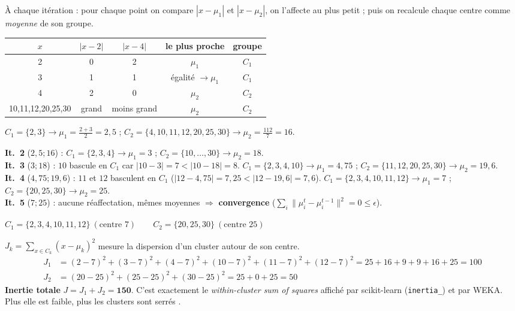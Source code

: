 À chaque itération : pour chaque point on compare $|x-\mu_1|$ et $|x-\mu_2|$, on l'affecte au
plus petit ; puis on recalcule chaque centre comme \emph{moyenne} de son groupe.

\begin{Calcul}[: itération 1 en entier ($\mu_1{=}2,\mu_2{=}4$)]
\begin{center}\small
\begin{tabular}{ccccc}
\toprule
$x$ & $|x-2|$ & $|x-4|$ & le plus proche & groupe\\
\midrule
2 & 0 & 2 & $\mu_1$ & $C_1$\\
3 & 1 & 1 & égalité $\to\mu_1$ & $C_1$\\
4 & 2 & 0 & $\mu_2$ & $C_2$\\
10,11,12,20,25,30 & grand & moins grand & $\mu_2$ & $C_2$\\
\bottomrule
\end{tabular}
\end{center}
$C_1=\{2,3\}\to\mu_1=\tfrac{2+3}{2}=2{,}5$ ;\quad
$C_2=\{4,10,11,12,20,25,30\}\to\mu_2=\tfrac{112}{7}=16$.
\end{Calcul}

\begin{Calcul}
\textbf{It.\ 2} ($2{,}5;16$) : $C_1=\{2,3,4\}\to\mu_1=3$ ; $C_2=\{10,\dots,30\}\to\mu_2=18$.\\
\textbf{It.\ 3} ($3;18$) : $10$ bascule en $C_1$ car $|10-3|=7<|10-18|=8$.
$C_1=\{2,3,4,10\}\to\mu_1=4{,}75$ ; $C_2=\{11,12,20,25,30\}\to\mu_2=19{,}6$.\\
\textbf{It.\ 4} ($4{,}75;19{,}6$) : $11$ et $12$ basculent en $C_1$ ($|12-4{,}75|=7{,}25<|12-19{,}6|=7{,}6$).
$C_1=\{2,3,4,10,11,12\}\to\mu_1=7$ ; $C_2=\{20,25,30\}\to\mu_2=25$.\\
\textbf{It.\ 5} ($7;25$) : aucune réaffectation, mêmes moyennes $\Rightarrow$
\textbf{convergence} ($\sum_i\|\mu_i^{t}-\mu_i^{t-1}\|^2=0\le\epsilon$).
\end{Calcul}

\begin{Exemple}[résultat]
$\boxed{C_1=\{2,3,4,10,11,12\}\ (\text{centre }7) \qquad C_2=\{20,25,30\}\ (\text{centre }25)}$
\end{Exemple}

\begin{Calcul}
$J_k=\sum_{x\in C_k}(x-\mu_k)^2$ mesure la dispersion d'un cluster autour de son centre.
\begin{align*}
J_1 &=(2{-}7)^2+(3{-}7)^2+(4{-}7)^2+(10{-}7)^2+(11{-}7)^2+(12{-}7)^2=25{+}16{+}9{+}9{+}16{+}25=100\\
J_2 &=(20{-}25)^2+(25{-}25)^2+(30{-}25)^2=25{+}0{+}25=50
\end{align*}
\textbf{Inertie totale} $J=J_1+J_2=\mathbf{150}$. C'est exactement le \emph{within-cluster
sum of squares} affiché par scikit-learn (\texttt{inertia\_}) et par WEKA. Plus elle est
faible, plus les clusters sont \og serrés \fg{}.
\end{Calcul}

